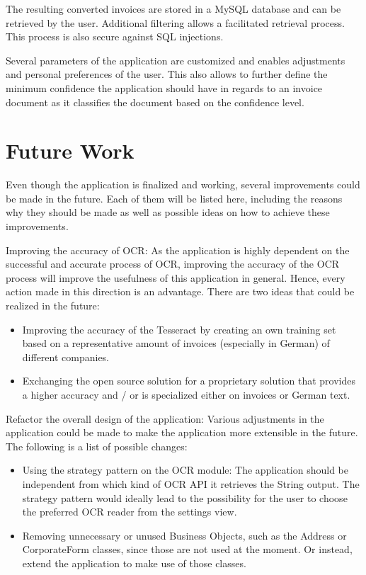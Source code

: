 The resulting converted invoices are stored in a MySQL database and can be retrieved by the user. Additional filtering allows a facilitated retrieval process. This process is also secure against SQL injections.

Several parameters of the application are customized and enables adjustments and personal preferences of the user. This also allows to further define the minimum confidence the application should have in regards to an invoice document as it classifies the document based on the confidence level. 

\section{Future Work}
\label{sec6.2}
Even though the application is finalized and working, several improvements could be made in the future.
Each of them will be listed here, including the reasons why they should be made as well as possible ideas on how to achieve these improvements.

Improving the accuracy of OCR: As the application is highly dependent on the successful and accurate process of OCR, improving the accuracy of the OCR process will improve the usefulness of this application in general. Hence, every action made in this direction is an advantage. There are two ideas that could be realized in the future: 
	\begin{itemize}
		\item Improving the accuracy of the Tesseract by creating an own training set based on a representative amount of invoices (especially in German) of different companies. 
		\item Exchanging the open source solution for a proprietary solution that provides a higher accuracy and / or is specialized either on invoices or German text.
	\end{itemize}

Refactor the overall design of the application: Various adjustments in the application could be made to make the application more extensible in the future. The following is a list of possible changes:
	\begin{itemize}
		\item Using the strategy pattern on the OCR module: The application should be independent from which kind of OCR API it retrieves the String output. The strategy pattern would ideally lead to the possibility for the user to choose the preferred OCR reader from the settings view.
		\item Removing unnecessary or unused Business Objects, such as the Address or CorporateForm classes, since those are not used at the moment. Or instead, extend the application to make use of those classes.
	\end{itemize}

